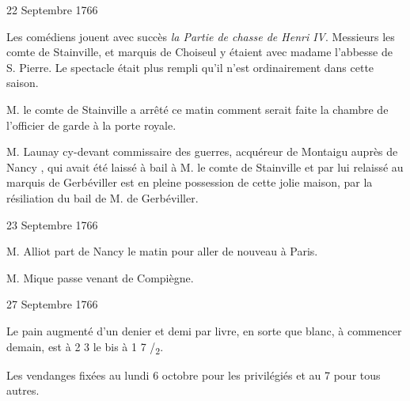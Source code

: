                      \begin{diary}{22 Septembre 1766}{}

                         Les comédiens jouent avec succès
                              \emph{la Partie
                              de chasse de Henri IV}. Messieurs les comte de Stainville,
                           et marquis de Choiseul y
                           étaient avec madame
                              l’abbesse de S. Pierre. Le spectacle était plus
                           rempli qu’il n’est ordinairement dans cette saison. \bigskip



                           M. le comte de Stainville a
                           arrêté ce matin
                           comment serait faite la chambre de l’officier
                           de garde à la porte royale. \bigskip



                           M. Launay
                           cy-devant
                           commissaire des guerres, acquéreur
                           de Montaigu auprès de
                              Nancy , qui avait
                           été laissé à bail à M. le comte de
                              Stainville
                           et par lui relaissé au marquis de
                              Gerbéviller
                           est en pleine possession de cette jolie maison,
                           par la résiliation du bail de M. de
                              Gerbéviller. \bigskip


                     \end{diary}

                     \begin{diary}{23 Septembre 1766}{}


                           M. Alliot part de Nancy le matin pour aller
                           de nouveau à Paris. \bigskip



                           M. Mique passe venant de
                              Compiègne. \bigskip


                     \end{diary}


                     \begin{diary}{27 Septembre 1766}{}

                         Le pain augmenté d’un denier et demi
                           par livre, en sorte que blanc, à
                           commencer demain, est à 2 3 le bis
                           à 1 7
                           /\textsubscript{2}. \bigskip


                         Les vendanges fixées au lundi 6 octobre
                           pour les privilégiés et au 7 pour
                           tous autres. \bigskip


                     \end{diary}

